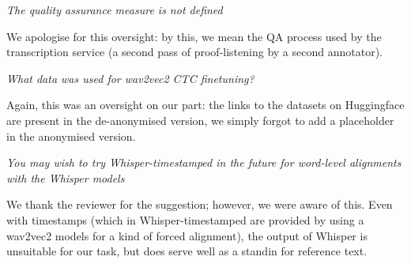 \documentclass[11pt]{journalrebuttal}
\begin{document}
\textit{The quality assurance measure is not defined}

We apologise for this oversight: by this, we mean the QA process used by the transcription service (a second pass of proof-listening by a second annotator).


\textit{What data was used for wav2vec2 CTC finetuning?}

Again, this was an oversight on our part: the links to the datasets on Huggingface are present in the de-anonymised version, we simply forgot to add a placeholder in the anonymised version.

\textit{You may wish to try Whisper-timestamped in the future for word-level alignments with the Whisper models}

We thank the reviewer for the suggestion; however, we were aware of this. Even with timestamps (which in Whisper-timestamped are provided by using a wav2vec2 models for a kind of forced alignment), the output of Whisper is unsuitable for our task, but does serve well as a standin for reference text.


\end{document}
